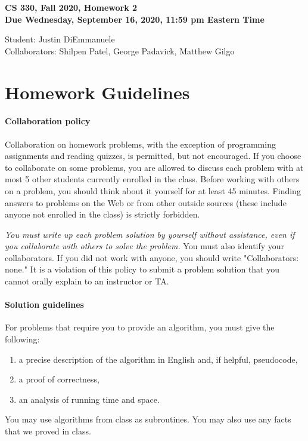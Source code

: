 \documentclass[11pt]{article}
\begin{document}
	
\begin{center}
\Large{\textbf{CS 330, Fall 2020, Homework 2 \\
Due Wednesday, September
  16, 2020, 11:59 pm Eastern Time}}
\end{center}

\begin{center}
   Student: Justin DiEmmanuele \\
    Collaborators: Shilpen Patel, George Padavick, Matthew Gilgo
\end{center}



\section*{Homework Guidelines}

\paragraph{Collaboration policy} Collaboration on homework problems, with the exception of
programming assignments and reading quizzes, is permitted, but not encouraged.
If you
choose to collaborate on some problems, you are allowed to discuss
each problem with at most 5 other students currently enrolled in the
class.
Before working with others on a problem, you should think about it
yourself for at least 45 minutes. Finding answers to problems on the
Web or from other outside sources (these include anyone not enrolled
in the class) is strictly forbidden.

{\em You must write up each problem solution by yourself without
assistance, even if you collaborate with others to solve the
problem.} You must also identify your collaborators. If you did not
work with anyone, you should write "Collaborators: none." It is a
violation of this policy to submit a problem solution that you
cannot orally explain to an instructor or TA.

\paragraph{Solution guidelines} For problems that require you to provide an algorithm, you must give the following:
    \begin{enumerate}
\item  a precise description of the algorithm in English and, if helpful, pseudocode,
\item a proof of correctness,
\item an analysis of running time and space.
\end{enumerate}
You may use algorithms from class as subroutines. You may also use any facts that we proved in class.
\end{document}
